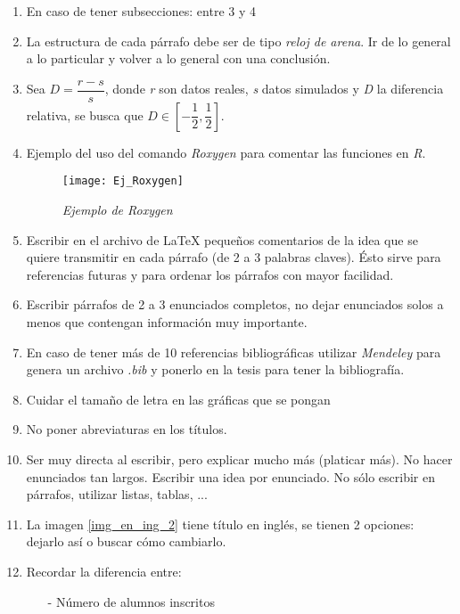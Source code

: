 \begin{enumerate}
  \item En caso de tener subsecciones: entre 3 y 4
  
  \item La estructura de cada párrafo debe ser de tipo \textit{reloj de arena}. Ir de lo general a lo particular y volver a lo general con una conclusión.
  
  \item Sea $D = \dfrac{r - s}{s}$, donde \textit{r} son datos reales, \textit{s} datos simulados y \textit{D} la diferencia relativa, se busca que $D \in \left[ -\dfrac{1}{2},\dfrac{1}{2}\right]$. 
  
  \item Ejemplo del uso del comando \textit{Roxygen} para comentar las funciones en \textit{R}.
\begin{figure}[H]
\centering
\texttt{[image: Ej\_Roxygen]} %
\caption{\textit{Ejemplo de Roxygen}}
\end{figure}
  
  \item Escribir en el archivo de LaTeX pequeños comentarios de la idea que se quiere transmitir en cada párrafo (de 2 a 3 palabras claves). Ésto sirve para referencias futuras y para ordenar los párrafos con mayor facilidad.
  
  \item Escribir párrafos de 2 a 3 enunciados completos, no dejar enunciados solos a menos que contengan información muy importante.
  
  \item En caso de tener más de 10 referencias bibliográficas utilizar \textit{Mendeley} para genera un archivo \textit{.bib} y  ponerlo en la tesis para tener la bibliografía.
  
  \item Cuidar el tamaño de letra en las gráficas que se pongan
  
  \item No poner abreviaturas en los títulos.
  
  \item Ser muy directa al escribir, pero explicar mucho más (platicar más). No hacer enunciados tan largos. Escribir una idea por enunciado. No sólo escribir en párrafos, utilizar listas, tablas, ...
  
  \item La imagen \ref{img_en_ing_2} tiene título en inglés, se tienen 2 opciones: dejarlo así o buscar cómo cambiarlo.
  
  \item Recordar la diferencia entre:
  \begin{itemize}
  	\item[-] Número de alumnos inscritos
  	

\end{itemize}
\end{enumerate}
